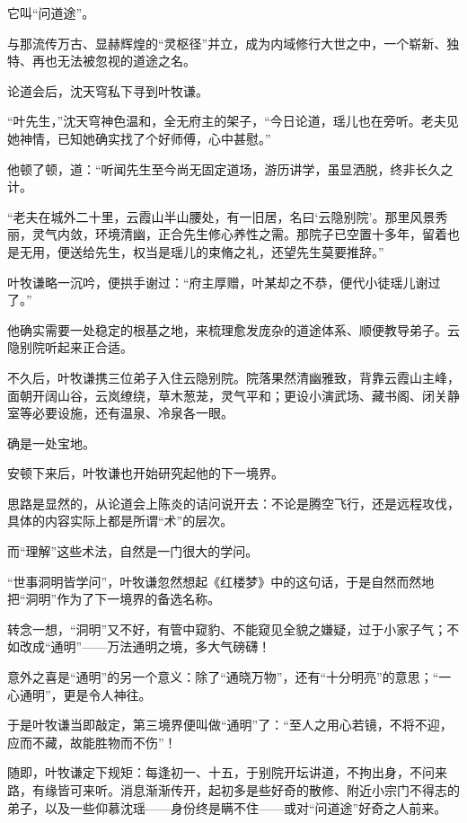 它叫“问道途”。

与那流传万古、显赫辉煌的“灵枢径”并立，成为内域修行大世之中，一个崭新、独特、再也无法被忽视的道途之名。

\vspace{2em}

论道会后，沈天穹私下寻到叶牧谦。

“叶先生，”沈天穹神色温和，全无府主的架子，“今日论道，瑶儿也在旁听。老夫见她神情，已知她确实找了个好师傅，心中甚慰。”

他顿了顿，道：“听闻先生至今尚无固定道场，游历讲学，虽显洒脱，终非长久之计。

“老夫在城外二十里，云霞山半山腰处，有一旧居，名曰‘云隐别院’。那里风景秀丽，灵气内敛，环境清幽，正合先生修心养性之需。那院子已空置十多年，留着也是无用，便送给先生，权当是瑶儿的束脩之礼，还望先生莫要推辞。”

叶牧谦略一沉吟，便拱手谢过：“府主厚赠，叶某却之不恭，便代小徒瑶儿谢过了。”

他确实需要一处稳定的根基之地，来梳理愈发庞杂的道途体系、顺便教导弟子。云隐别院听起来正合适。

不久后，叶牧谦携三位弟子入住云隐别院。院落果然清幽雅致，背靠云霞山主峰，面朝开阔山谷，云岚缭绕，草木葱茏，灵气平和；更设小演武场、藏书阁、闭关静室等必要设施，还有温泉、冷泉各一眼。

确是一处宝地。

\vspace{2em}

安顿下来后，叶牧谦也开始研究起他的下一境界。

思路是显然的，从论道会上陈炎的诘问说开去：不论是腾空飞行，还是远程攻伐，具体的内容实际上都是所谓“术”的层次。

而“理解”这些术法，自然是一门很大的学问。

“世事洞明皆学问”，叶牧谦忽然想起《红楼梦》中的这句话，于是自然而然地把“洞明”作为了下一境界的备选名称。

转念一想，“洞明”又不好，有管中窥豹、不能窥见全貌之嫌疑，过于小家子气；不如改成“通明”——万法通明之境，多大气磅礴！

意外之喜是“通明”的另一个意义：除了“通晓万物”，还有“十分明亮”的意思；“一心通明”，更是令人神往。

于是叶牧谦当即敲定，第三境界便叫做“通明”了：“至人之用心若镜，不将不迎，应而不藏，故能胜物而不伤”！

随即，叶牧谦定下规矩：每逢初一、十五，于别院开坛讲道，不拘出身，不问来路，有缘皆可来听。消息渐渐传开，起初多是些好奇的散修、附近小宗门不得志的弟子，以及一些仰慕沈瑶——身份终是瞒不住——或对“问道途”好奇之人前来。

